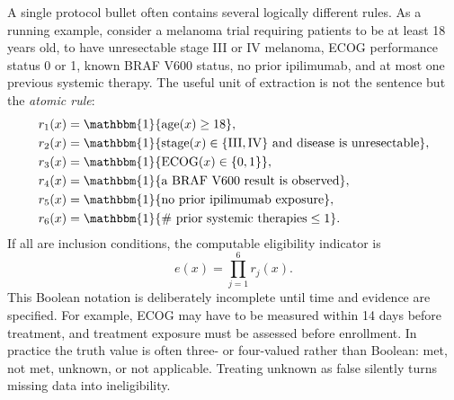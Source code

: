 \documentclass[12pt,oneside]{book}
\numberwithin{equation}{section}
\theoremstyle{definition}
\theoremstyle{plain}
\theoremstyle{remark}
\newcommand{\ind}{\mathbbm{1}}
\begin{document}
A single protocol bullet often contains several logically different rules.  As
a running example, consider a melanoma trial requiring patients to be at least
18 years old, to have unresectable stage III or IV melanoma, ECOG performance
status 0 or 1, known BRAF V600 status, no prior ipilimumab, and at most one
previous systemic therapy.  The useful unit of extraction is not the sentence
but the \emph{atomic rule}:
\begin{align*}
  r_1(x)&=\ind\{\operatorname{age}(x)\ge 18\},\\
  r_2(x)&=\ind\{\operatorname{stage}(x)\in\{\mathrm{III},\mathrm{IV}\}
                    \text{ and disease is unresectable}\},\\
  r_3(x)&=\ind\{\operatorname{ECOG}(x)\in\{0,1\}\},\\
  r_4(x)&=\ind\{\text{a BRAF V600 result is observed}\},\\
  r_5(x)&=\ind\{\text{no prior ipilimumab exposure}\},\\
  r_6(x)&=\ind\{\#\text{ prior systemic therapies}\le 1\}.
\end{align*}
If all are inclusion conditions, the computable eligibility indicator is
\[
    e(x)=\prod_{j=1}^6 r_j(x).
\]
This Boolean notation is deliberately incomplete until time and evidence are
specified.  For example, ECOG may have to be measured within 14 days before
treatment, and treatment exposure must be assessed before enrollment.  In
practice the truth value is often three- or four-valued rather than Boolean:
met, not met, unknown, or not applicable.  Treating unknown as false silently
turns missing data into ineligibility.
\end{document}

